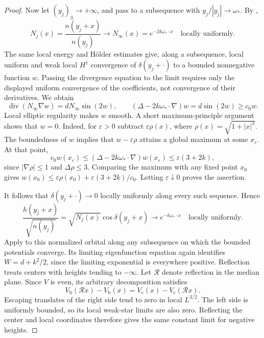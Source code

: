 \begin{proof}
Now let \((y_j)_3\to+\infty\), and pass to a subsequence with
\(y_j/|y_j|\to\omega_*\).  By ,
\[
 N_j(x)=\frac{n(y_j+x)}{n(y_j)}
 \longrightarrow N_\infty(x)=e^{-2k\omega_*\cdot x}
 \quad\text{locally uniformly}.
\]
The same local energy and H\"older estimates give, along a subsequence,
local uniform and weak local \(H^1\) convergence of
\(\delta(y_j+\cdot)\) to a bounded nonnegative function \(w\).
Passing the divergence equation to the limit requires only the displayed
uniform convergence of the coefficients, not convergence of their
derivatives.  We obtain
\[
 \operatorname{div}(N_\infty\nabla w)=dN_\infty\sin(2w),\qquad
 (\Delta-2k\omega_*\cdot\nabla)w=d\sin(2w)\ge c_0w.
\]
Local elliptic regularity makes \(w\) smooth.  A short maximum-principle
argument shows that \(w=0\).  Indeed, for \(\varepsilon>0\) subtract
\(\varepsilon\rho(x)\), where
\(\rho(x)=\sqrt{1+|x|^2}\).  The boundedness of \(w\) implies that
\(w-\varepsilon\rho\) attains a global maximum at some \(x_\varepsilon\).
At that point,
\[
 c_0w(x_\varepsilon)
 \le (\Delta-2k\omega_*\cdot\nabla)w(x_\varepsilon)
 \le\varepsilon(3+2k),
\]
since \(|\nabla\rho|\le1\) and \(\Delta\rho\le3\).  Comparing the
maximum with any fixed point \(x_0\) gives
\(w(x_0)\le\varepsilon\rho(x_0)+\varepsilon(3+2k)/c_0\).
Letting \(\varepsilon\downarrow0\) proves the assertion.

It follows that \(\delta(y_j+\cdot)\to0\) locally uniformly along every
such sequence.  Hence
\[
 \frac{h(y_j+x)}{\sqrt{n(y_j)}}
 =\sqrt{N_j(x)}\cos\delta(y_j+x)
 \longrightarrow e^{-k\omega_*\cdot x}
 \quad\text{locally uniformly}.
\]
Apply  to this normalized orbital
along any subsequence on which the bounded potentials converge.  Its
limiting eigenfunction equation again identifies
\(W=d+k^2/2\), since the limiting exponential is everywhere positive.
Reflection treats centers with heights tending to \(-\infty\).
Let \(\mathcal R\) denote reflection in the median plane.
Since \(V\) is even, its arbitrary decomposition satisfies
\[
 V_{\mathrm b}(\mathcal R x)-V_{\mathrm b}(x)
 =V_{\mathrm c}(x)-V_{\mathrm c}(\mathcal R x).
\]
Escaping translates of the right side tend to zero in local
\(L^{3/2}\).  The left side is uniformly bounded, so its local
weak-star limits are also zero.  Reflecting the center and local
coordinates therefore gives the same constant limit for negative heights.


\end{proof}
